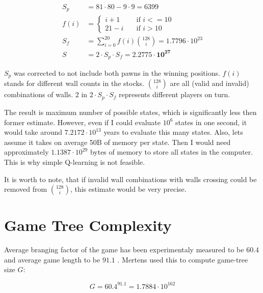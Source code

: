 \begin{center}
  \vspace*{-1.30cm}
  \begin{equation}
    \label{eqn:myestimate}
    \begin{aligned}
      S_p &= 81 {\cdot} 80 - 9 {\cdot} 9 = 6399\\[-0.20cm]
      f(i)\!&=\! \begin{cases}
        i + 1  & \quad \text{if } i <= 10 \\[-0.30cm]
        21 - i & \quad \text{if } i > 10
      \end{cases}\\
      S_f\! &=\! \sum_{i=0}^{20} f(i){128 \choose i} = 1.7796 {\cdot} 10^{23}
      \\
      S &= 2 {\cdot} S_p {\cdot} S_f = \mathbf{2.2775{\cdot}10^{27}}
    \end{aligned}
  \end{equation}
  \vspace*{-1.15cm}
\end{center}

$S_p$ was corrected to not include both pawns in the winning positions.
$f(i)$ %
stands for different wall counts in the stocks.
${128 \choose i}$ are all (valid and invalid) combinations of walls.
$2$ in $2{\cdot} S_p {\cdot} S_f$ represents different players on turn.

The result is maximum number of possible states, which is significantly
less then former estimate. However, even if I could evaluate $10^{6}$
states in one second, it would take around $7.2172{\cdot}10^{13}$ years to
evaluate this many states. Also, lets assume it takes on average 50B
of memory per state. Then I would need approximately
$1.1387{\cdot}10^{29}$ bytes of memory to store all states in the
computer. This is why simple Q-learning is not feasible.

It is worth to note, that if invalid wall combinations with walls crossing
could be removed from ${128 \choose i}$, this estimate would be very precise.

\section{Game Tree Complexity}
Average branging factor of the game has been experimentaly measured to be
$60.4$ and average game length to be $91.1$ \cite{glendenning}.
Mertens \cite{mertens} used this to compute game-tree size $G$:
\begin{center}
  \vspace*{-1.30cm}
  \begin{equation}
    \label{eqn:mgtc}
    G = 60.4^{91.1} = 1.7884{\cdot}10^{162}
  \end{equation}
  \vspace*{-1.30cm}
\end{center}


